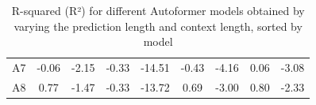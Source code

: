 \begin{table}[]
{\begin{tabular}{ccccccccc}
    \cellcolor[HTML]{FFFFFF}A7 & \cellcolor[HTML]{FCBD7B}-0.06 & \cellcolor[HTML]{FEE182}-2.15 & \cellcolor[HTML]{FEEA83}-0.33 & \cellcolor[HTML]{F8696B}-14.51 & \cellcolor[HTML]{F8696B}-0.43 & \cellcolor[HTML]{F8696B}-4.16 & \cellcolor[HTML]{FED880}0.06 & \cellcolor[HTML]{F8796E}-3.08 \\
    \cellcolor[HTML]{FFFFFF}A8 & \cellcolor[HTML]{E5E483}0.77  & \cellcolor[HTML]{DAE182}-1.47 & \cellcolor[HTML]{FEEA83}-0.33 & \cellcolor[HTML]{F8736C}-13.72 & \cellcolor[HTML]{FEEB84}0.69  & \cellcolor[HTML]{FCC37C}-3.00 & \cellcolor[HTML]{FEE983}0.80 & \cellcolor[HTML]{FBA276}-2.33
    \end{tabular}%
    }
    \caption{R-squared (R²) for different Autoformer models obtained by varying the prediction length and context length, sorted by model}
    \label{A1_R}
    \end{table}


